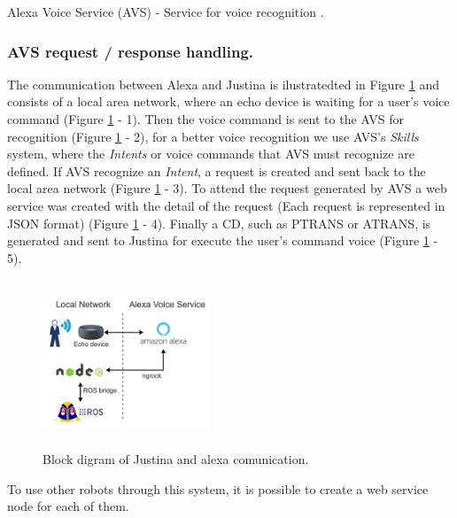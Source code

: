 \documentclass{llncs}
\begin{document}
	Alexa Voice Service (AVS) - Service for voice recognition \cite{avs}.
\vspace{.01 in}

\subsubsection{AVS request / response handling.}

The communication between Alexa and Justina is ilustratedted in Figure \ref{fig:alexaconexion} and 
consists of a local area network, 
where an echo device is waiting for a user's voice command (Figure \ref{fig:alexaconexion} - 1). 
Then the voice command is sent to the AVS for recognition (Figure \ref{fig:alexaconexion} - 2), 
for a better voice recognition we use AVS's \textit{Skills} system, where the \textit{Intents} or voice commands that AVS must recognize are defined.
If AVS recognize an \textit{Intent}, 
a request is created and sent back to the local area network (Figure \ref{fig:alexaconexion} - 3). 
To attend the request generated by AVS a web service was created with the detail of the request (Each request is represented in JSON format) (Figure \ref{fig:alexaconexion} - 4). 
Finally a CD, such as PTRANS or ATRANS, is generated and sent to Justina for execute the user's command voice (Figure \ref{fig:alexaconexion} - 5).
\begin{figure}[h]
	\centering
	\includegraphics[angle=0, height=5cm, width=5cm]{Figures/alexa2.png}
	\caption{Block digram of Justina and alexa comunication.}
	\label{fig:alexaconexion}
\end{figure}

To use other robots through this system, 
it is possible to create a web service node for each of them. 

\end{document}
